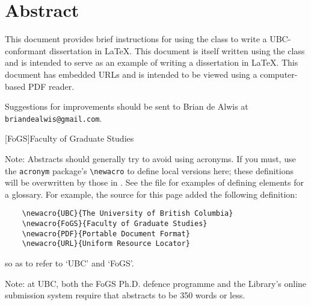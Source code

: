 \chapter{Abstract}

This document provides brief instructions for using the 
class to write a \acs{UBC}-conformant dissertation in \LaTeX.  This
document is itself written using the  class and is
intended to serve as an example of writing a dissertation in \LaTeX.
This document has embedded \acp{URL} and is intended to be viewed
using a computer-based \ac{PDF} reader.

Suggestions for improvements should be sent to Brian de Alwis at
\texttt{briandealwis@gmail.com}.

[FoGS]{Faculty of Graduate Studies}

Note: Abstracts should generally try to avoid using acronyms.  If you
must, use the \verb+acronym+ package's \verb+\newacro+ to define
local versions here; these definitions will be overwritten by those
in .  See the  file for
examples of defining elements for a glossary.
For example, the source for this page added the following definition:
\begin{verbatim}
    \newacro{UBC}{The University of British Columbia}
    \newacro{FoGS}{Faculty of Graduate Studies}
    \newacro{PDF}{Portable Document Format}
    \newacro{URL}{Uniform Resource Locator}
\end{verbatim}
so as to refer to `\ac{UBC}' and `\ac{FoGS}'.

Note: at \ac{UBC}, both the \ac{FoGS} Ph.D. defence programme and the
Library's online submission system require that abstracts to be 350
words or less.
